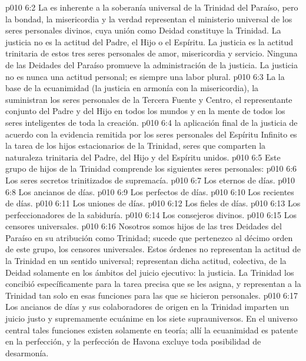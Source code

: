 \vs p010 6:2 \pc La  es inherente a la soberanía universal de la Trinidad del Paraíso, pero la bondad, la misericordia y la verdad representan el ministerio universal de los seres personales divinos, cuya unión como Deidad constituye la Trinidad. La justicia no es la actitud del Padre, el Hijo o el Espíritu. La justicia es la actitud trinitaria de estos tres seres personales de amor, misericordia y servicio. Ninguna de las Deidades del Paraíso promueve la administración de la justicia. La justicia no es nunca una actitud personal; es siempre una labor plural.
\vs p010 6:3 \pc La  la base de la ecuanimidad (la justicia en armonía con la misericordia), la suministran los seres personales de la Tercera Fuente y Centro, el representante conjunto del Padre y del Hijo en todos los mundos y en la mente de todos los seres inteligentes de toda la creación.
\vs p010 6:4 \pc {} la aplicación final de la justicia de acuerdo con la evidencia remitida por los seres personales del Espíritu Infinito es la tarea de los hijos estacionarios de la Trinidad, seres que comparten la naturaleza trinitaria del Padre, del Hijo y del Espíritu unidos.
\vs p010 6:5 \pc Este grupo de hijos de la Trinidad comprende los siguientes seres personales:
\vs p010 6:6 Los seres secretos trinitizados de supremacía.
\vs p010 6:7 Los eternos de días.
\vs p010 6:8 Los ancianos de días.
\vs p010 6:9 Los perfectos de días.
\vs p010 6:10 Los recientes de días.
\vs p010 6:11 Los uniones de días.
\vs p010 6:12 Los fieles de días.
\vs p010 6:13 Los perfeccionadores de la sabiduría.
\vs p010 6:14 Los consejeros divinos.
\vs p010 6:15 Los censores universales.
\vs p010 6:16 \pc Nosotros somos hijos de las tres Deidades del Paraíso en su atribución como Trinidad; sucede que pertenezco al décimo orden de este grupo, los censores universales. Estos órdenes no representan la actitud de la Trinidad en un sentido universal; representan dicha actitud, colectiva, de la Deidad solamente en los ámbitos del juicio ejecutivo: la justicia. La Trinidad los concibió específicamente para la tarea precisa que se les asigna, y representan a la Trinidad tan solo en esas funciones para las que se hicieron personales.
\vs p010 6:17 Los ancianos de días y sus colaboradores de origen en la Trinidad imparten un juicio justo y supremamente ecuánime en los siete suprauniversos. En el universo central tales funciones existen solamente en teoría; allí la ecuanimidad es patente en la perfección, y la perfección de Havona excluye toda posibilidad de desarmonía.
